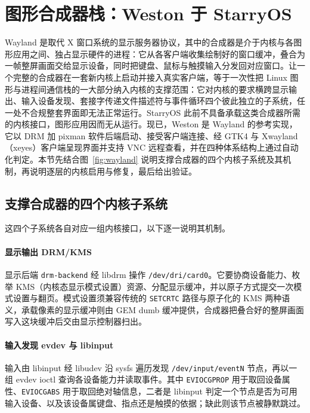 \section{图形合成器栈：Weston 于 StarryOS}

Wayland 是取代 X 窗口系统的显示服务器协议，其中的合成器是介于内核与各图形应用之间、独占显示硬件的进程：它从各客户端收集绘制好的窗口缓冲，叠合为一帧整屏画面交给显示设备，同时把键盘、鼠标与触摸输入分发回对应窗口。让一个完整的合成器在一套新内核上启动并接入真实客户端，等于一次性把 Linux 图形与进程间通信栈的一大部分纳入内核的支撑范围：它对内核的要求横跨显示输出、输入设备发现、套接字传递文件描述符与事件循环四个彼此独立的子系统，任一处不合规整套界面即无法正常运行。StarryOS 此前不具备承载这类合成器所需的内核接口，图形应用因而无从运行。现已，Weston 是 Wayland 的参考实现，它以 DRM 加 pixman 软件后端启动、接受客户端连接、经 GTK4 与 Xwayland（xeyes）客户端呈现界面并支持 VNC 远程查看，并在四种体系结构上通过自动化判定。本节先结合图~\ref{fig:wayland} 说明支撑合成器的四个内核子系统及其机制，再说明逐层的内核启用与修复，最后给出验证。


\subsection{支撑合成器的四个内核子系统}

这四个子系统各自对应一组内核接口，以下逐一说明其机制。

\paragraph{显示输出 DRM/KMS}
显示后端 \texttt{drm-backend} 经 libdrm 操作 \texttt{/dev/dri/card0}。它要协商设备能力、枚举 KMS（内核态显示模式设置）资源、分配显示缓冲，并以原子方式提交一次模式设置与翻页。模式设置须兼容传统的 \texttt{SETCRTC} 路径与原子化的 KMS 两种语义，承载像素的显示缓冲则由 GEM dumb 缓冲提供，合成器把叠合好的整屏画面写入这块缓冲后交由显示控制器扫出。

\paragraph{输入发现 evdev 与 libinput}
输入由 libinput 经 libudev 沿 sysfs 遍历发现 \texttt{/dev/input/eventN} 节点，再以一组 evdev ioctl 查询各设备能力并读取事件。其中 \texttt{EVIOCGPROP} 用于取回设备属性、\texttt{EVIOCGABS} 用于取回绝对轴信息，二者是 libinput 判定一个节点是否为可用输入设备、以及该设备属键盘、指点还是触摸的依据；缺此则该节点被静默跳过。

